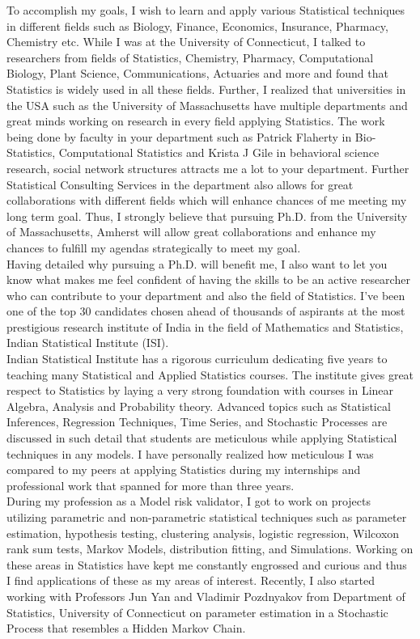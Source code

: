 \documentclass[12pt]{article}
\begin{document}
To accomplish my goals, I wish to learn and apply various Statistical techniques in different fields such as Biology, Finance, Economics, Insurance, Pharmacy, Chemistry etc. While I was at the University of Connecticut, I talked to researchers from fields of Statistics, Chemistry, Pharmacy, Computational Biology, Plant Science, Communications, Actuaries and more and found that Statistics is widely used in all these fields. Further, I realized that universities in the USA such as the University of Massachusetts have multiple departments and great minds working on research in every field applying Statistics. The work being done by faculty in your department such as Patrick Flaherty in Bio-Statistics, Computational Statistics and Krista J Gile in behavioral science research, social network structures attracts me a lot to your department. Further Statistical Consulting Services in the department also allows for great collaborations with different fields which will enhance chances of me meeting my long term goal. Thus, I strongly believe that pursuing Ph.D. from the University of Massachusetts, Amherst will allow great collaborations and enhance my chances to fulfill my agendas strategically to meet my goal. \\

Having detailed why pursuing a Ph.D. will benefit me, I also want to let you know what makes me feel confident of having the skills to be an active researcher who can contribute to your department and also the field of Statistics. I've been one of the top 30 candidates chosen ahead of thousands of aspirants at the most prestigious research institute of India in the field of Mathematics and Statistics, Indian Statistical Institute (ISI). \\

Indian Statistical Institute has a rigorous curriculum dedicating five years to teaching many Statistical and Applied Statistics courses.  The institute gives great respect to Statistics by laying a very strong foundation with courses in Linear Algebra, Analysis and Probability theory. Advanced topics such as Statistical Inferences, Regression Techniques, Time Series, and Stochastic Processes are discussed in such detail that students are meticulous while applying Statistical techniques in any models. I have personally realized how meticulous I was compared to my peers at applying Statistics during my internships and professional work that spanned for more than three years. \\

During my profession as a Model risk validator, I got to work on projects utilizing parametric and non-parametric statistical techniques such as parameter estimation, hypothesis testing, clustering analysis, logistic regression, Wilcoxon rank sum tests, Markov Models, distribution fitting, and Simulations. Working on these areas in Statistics have kept me constantly engrossed and curious and thus I find applications of these as my areas of interest. Recently, I also started working with Professors Jun Yan and Vladimir Pozdnyakov from Department of Statistics, University of Connecticut on parameter estimation in a Stochastic Process that resembles a Hidden Markov Chain. \\
\end{document}
